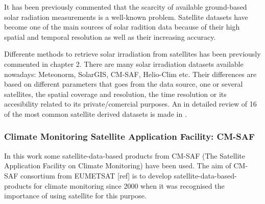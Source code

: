 It has been previously commented that the scarcity of available ground-based solar radiation measurements is a well-known problem. Satellite datasets have become one of the main sources of solar radition data because of their high spatial and temporal resolution as well as their increasing accuracy.

Differente methods to retrieve solar irradiation from satellites has been previously commented in chapter 2. There are many solar irradiation datasets available nowadays: Meteonorm, SolarGIS, CM-SAF, Helio-Clim etc. Their differences are based on different parameters that goes from the data source, one or several satellites, the spatial coverage and resolution, the time resolution or its accesibility related to its private/comercial purposes. An in detailed review of 16 of the most common satellite derived datasets is made in \cite*{Vernay2014}.


 

\subsubsection{Climate Monitoring Satellite Application Facility: CM-SAF}

In this work some satellite-data-based products from CM-SAF (The Satellite Application Facility on Climate Monitoring) have been used. The aim of CM-SAF consortium from EUMETSAT [ref] is to develop satellite-data-based-products for climate monitoring since 2000 when it was recognised the importance of using satellite for this purpose.


